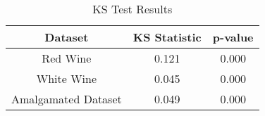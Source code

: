 \begin{table}
	\begin{center}
		\begin{tabular}{|c|c|c|}
			\hline
			Dataset & KS Statistic & p-value \\
			\hline
			Red Wine & 0.121 & 0.000 \\
			\hline
			White Wine & 0.045 & 0.000 \\
			\hline
			Amalgamated Dataset & 0.049 & 0.000 \\
			\hline
		\end{tabular}
	\end{center}
	\caption{KS Test Results}
	\label{tab:ks_test}
\end{table}
